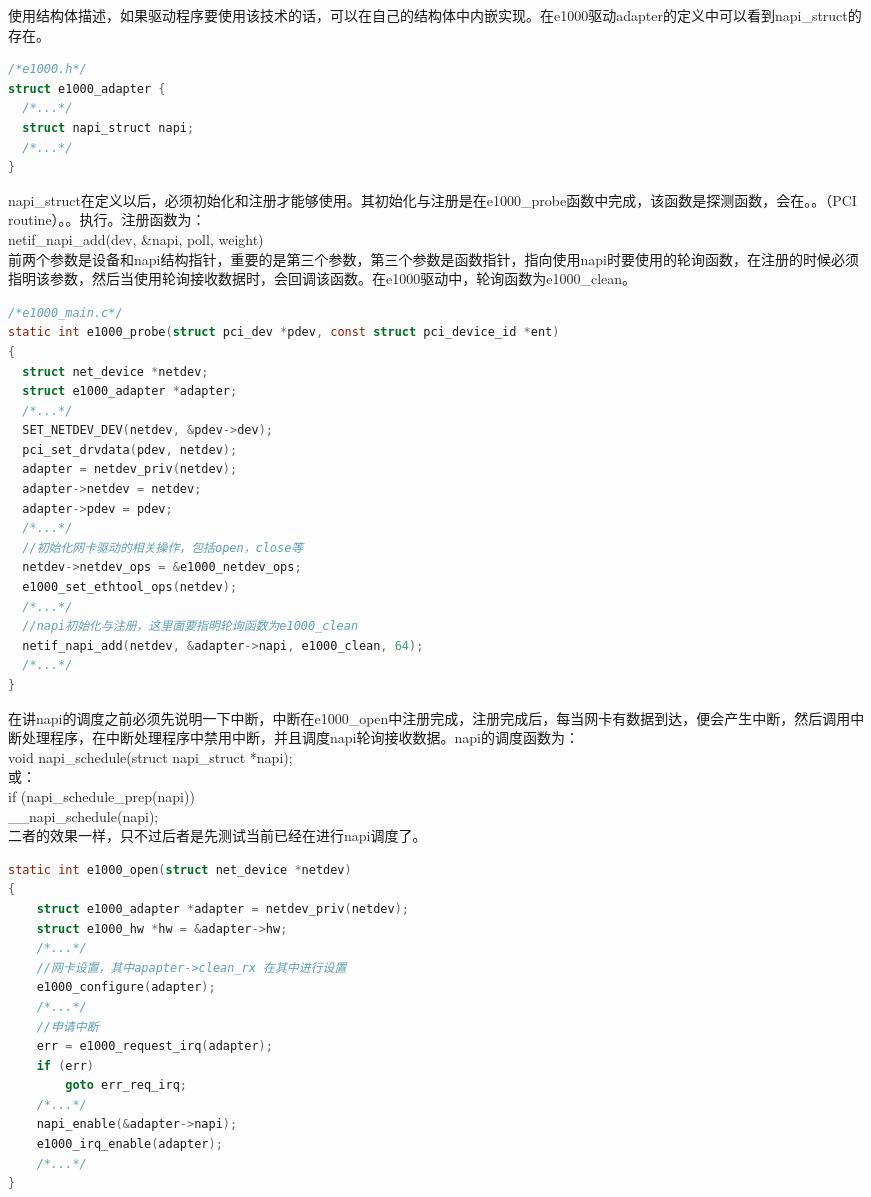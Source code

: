 \documentclass[fontsize=11pt, %
                             paper=a4, %
                             oneside, %
                             captions=tableheading,
                             index=totoc,
                             hyperref]{labbook}
\begin{document}
\begin{addmargin}[0cm]{0cm}
\indent {}使用结构体描述，如果驱动程序要使用该技术的话，可以在自己的结构体中内嵌实现。在e1000驱动adapter的定义中可以看到napi\_struct的存在。\\
\begin{lstlisting}[language=C]
/*e1000.h*/
struct e1000_adapter {
  /*...*/
  struct napi_struct napi;
  /*...*/
}
\end{lstlisting}

\indent napi\_struct在定义以后，必须初始化和注册才能够使用。其初始化与注册是在e1000\_probe函数中完成，该函数是探测函数，会在。。（PCI routine）。。执行。注册函数为： \\ netif\_napi\_add(dev, \&napi, poll, weight) \\前两个参数是设备和napi结构指针，重要的是第三个参数，第三个参数是函数指针，指向使用napi时要使用的轮询函数，在注册的时候必须指明该参数，然后当使用轮询接收数据时，会回调该函数。在e1000驱动中，轮询函数为e1000\_clean。
\begin{lstlisting}[language=C]
/*e1000_main.c*/
static int e1000_probe(struct pci_dev *pdev, const struct pci_device_id *ent)
{
  struct net_device *netdev;
  struct e1000_adapter *adapter;
  /*...*/
  SET_NETDEV_DEV(netdev, &pdev->dev);
  pci_set_drvdata(pdev, netdev);
  adapter = netdev_priv(netdev);
  adapter->netdev = netdev;
  adapter->pdev = pdev;
  /*...*/
  //初始化网卡驱动的相关操作，包括open，close等
  netdev->netdev_ops = &e1000_netdev_ops;
  e1000_set_ethtool_ops(netdev);
  /*...*/
  //napi初始化与注册，这里面要指明轮询函数为e1000_clean
  netif_napi_add(netdev, &adapter->napi, e1000_clean, 64);
  /*...*/
}
\end{lstlisting}

\indent 在讲napi的调度之前必须先说明一下中断，中断在e1000\_open中注册完成，注册完成后，每当网卡有数据到达，便会产生中断，然后调用中断处理程序，在中断处理程序中禁用中断，并且调度napi轮询接收数据。napi的调度函数为：\\
void napi\_schedule(struct napi\_struct *napi); \\
或：\\
if (napi\_schedule\_prep(napi))\\
    \_\_napi\_schedule(napi);\\
二者的效果一样，只不过后者是先测试当前已经在进行napi调度了。\\

\begin{lstlisting}[language=C]
static int e1000_open(struct net_device *netdev)
{
    struct e1000_adapter *adapter = netdev_priv(netdev);
    struct e1000_hw *hw = &adapter->hw;
    /*...*/
    //网卡设置，其中apapter->clean_rx 在其中进行设置
    e1000_configure(adapter);
    /*...*/
    //申请中断
    err = e1000_request_irq(adapter);
    if (err)
        goto err_req_irq;
    /*...*/
    napi_enable(&adapter->napi);
    e1000_irq_enable(adapter);
    /*...*/
}


\end{lstlisting}
\end{addmargin}
\end{document}
